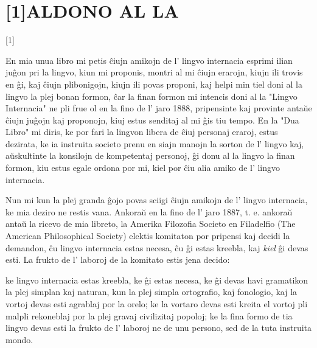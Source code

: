 \documentclass[12pt,twoside]{book}
\begin{document}
\sloppy
{}

%
%
\titleformat{\chapter}[display]{\centering}{\chaptertitlename}{0pt}{\Huge}
\renewcommand{\footrulewidth}{0pt}
\chapter*{\scalebox{0.8}[1]{ALDONO AL LA}}
\fancyhead[C]{--- \thepage{} ---}

\begin{center}
\vspace{1ex}
\scalebox{1}[1]{}

\end{center}

 En mia unua libro mi petis ĉiujn amikojn de l' lingvo internacia esprimi ilian juĝon pri la lingvo, kiun mi proponis, montri al mi ĉiujn erarojn, kiujn ili trovis en ĝi, kaj ĉiujn plibonigojn, kiujn ili povas proponi, kaj helpi min tiel doni al la lingvo la plej bonan formon, ĉar la finan formon mi intencis doni al la "Lingvo Internacia" ne pli frue ol en la fino de l' jaro 1888, pripensinte kaj provinte antaŭe ĉiujn juĝojn kaj proponojn, kiuj estus senditaj al mi ĝis tiu tempo. En la "Dua Libro" mi diris, ke por fari la lingvon libera de ĉiuj personaj eraroj, estus dezirata, ke ia instruita societo prenu en siajn manojn la sorton de l' lingvo kaj, aŭskultinte la konsilojn de kompetentaj personoj, ĝi donu al la lingvo la finan formon, kiu estus egale ordona por mi, kiel por ĉiu alia amiko de l' lingvo internacia.

Nun mi kun la plej granda ĝojo povas sciigi ĉiujn amikojn de l' lingvo internacia, ke mia deziro ne restis vana. Ankoraŭ en la fino de l' jaro 1887, t. e. ankoraŭ antaŭ la ricevo de mia libreto, la Amerika Filozofia Societo en Filadelfio (The American Philosophical Society) elektis komitaton por pripensi kaj decidi la demandon, ĉu lingvo internacia estas necesa, ĉu ĝi estas kreebla, kaj \emph{kiel} ĝi devas esti. La frukto de l' laboroj de la komitato estis jena decido:

    ke lingvo internacia estas kreebla, ke ĝi estas necesa, ke ĝi devas havi gramatikon la plej simplan kaj naturan, kun la plej simpla ortografio, kaj fonologio, kaj la vortoj devas esti agrablaj por la orelo; ke la vortaro devas esti kreita el vortoj pli malpli rekoneblaj por la plej gravaj civilizitaj popoloj; ke la fina formo de tia lingvo devas esti la frukto de l' laboroj ne de unu persono, sed de la tuta instruita mondo. 
\end{document}
